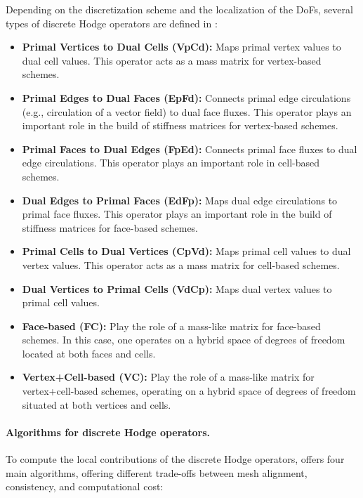 Depending on the discretization scheme and the localization of the DoFs, several
types of discrete Hodge operators are defined in \CS:
\begin{itemize}
\item \textbf{Primal Vertices to Dual Cells (VpCd):} Maps primal vertex values
  to dual cell values. This operator acts as a mass matrix for vertex-based
  schemes.
\item \textbf{Primal Edges to Dual Faces (EpFd):} Connects primal edge
  circulations (e.g., circulation of a vector field) to dual face fluxes. This
  operator plays an important role in the build of stiffness matrices for
  vertex-based schemes.
\item \textbf{Primal Faces to Dual Edges (FpEd):} Connects primal face fluxes to
  dual edge circulations. This operator plays an important role in cell-based
  schemes.
\item \textbf{Dual Edges to Primal Faces (EdFp):} Maps dual edge circulations to
  primal face fluxes. This operator plays an important role in the build of
  stiffness matrices for face-based schemes.
\item \textbf{Primal Cells to Dual Vertices (CpVd):} Maps primal cell values to
  dual vertex values. This operator acts as a mass matrix for cell-based
  schemes.
\item \textbf{Dual Vertices to Primal Cells (VdCp):} Maps dual vertex values to
  primal cell values.
\item \textbf{Face-based (FC):} Play the role of a mass-like matrix for
  face-based schemes. In this case, one operates on a hybrid space of degrees of
  freedom located at both faces and cells.
\item \textbf{Vertex+Cell-based (VC):} Play the role of a mass-like matrix for
  vertex+cell-based schemes, operating on a hybrid space of degrees of freedom
  situated at both vertices and cells.
\end{itemize}

\paragraph{Algorithms for discrete Hodge operators.}

To compute the local contributions of the discrete Hodge operators, \CS offers
four main algorithms, offering different trade-offs between mesh alignment,
consistency, and computational cost:


